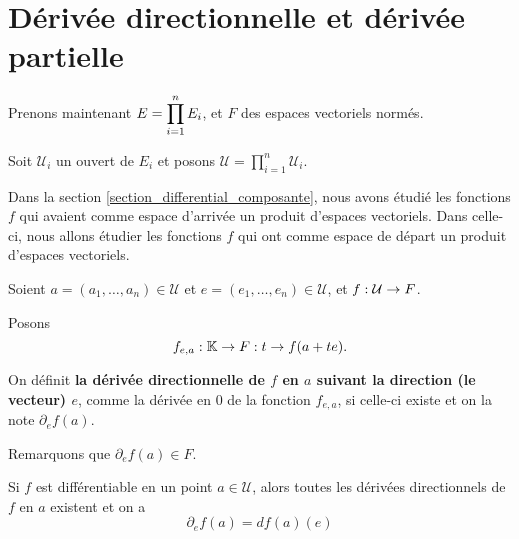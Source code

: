 \section{Dérivée directionnelle et dérivée partielle}
\label{section_directionnal_partial_derivative}

Prenons maintenant $E = \displaystyle \prod_{i = 1}^{n} E_{i}$, et $F$ des espaces vectoriels
normés.

Soit $\mathcal{U}_{i}$ un ouvert de $E_{i}$ et posons $\mathcal{U} =
\displaystyle \prod_{i = 1}^{n} \mathcal{U}_{i}$.

Dans la section \ref{section_differential_composante}, nous avons
étudié les fonctions $f$ qui avaient comme espace d'arrivée un produit d'espaces
vectoriels. Dans celle-ci, nous allons étudier les fonctions $f$ qui ont comme
espace de départ un produit d'espaces vectoriels.


\begin{definition}
\label{directionnal_application_definition}
	Soient $a = (a_{1}, \ldots, a_{n}) \in \mathcal{U}$ et $e = (e_{1}, \ldots,
	e_{n}) \in \mathcal{U}$,
	et $f : \mathcal{U} \rightarrow F$.

	Posons
	\begin{equation*}
		f_{e, a} : \mathbb{K} \rightarrow F: t \rightarrow f(a + te).
	\end{equation*}

	On définit \textbf{la dérivée directionnelle de $f$ en $a$ suivant la direction (le
	vecteur) $e$}, comme la dérivée en $0$ de la fonction $f_{e, a}$, si celle-ci
	existe et on la note ${\partial_{e} f}(a)$.

	Remarquons que $\partial_{e} f (a) \in F$.
\end{definition}

\begin{proposition}
	Si $f$ est différentiable en un point $a \in \mathcal{U}$, alors toutes les
	dérivées directionnels de $f$ en $a$ existent et on a
	\begin{equation*}
		\partial_{e}f(a) = df(a)(e)
	\end{equation*}
\end{proposition}

